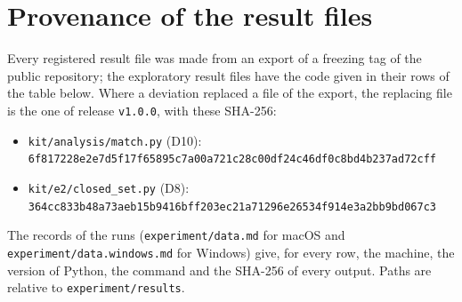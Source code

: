 
\section*{Provenance of the result files}
\label{sec:supp-provenance}

Every registered result file was made from an export of a freezing tag of the public repository; the exploratory result
files have the code given in their rows of the table below. Where a deviation replaced a file of the export, the
replacing file is the one of release \texttt{v1.0.0}, with these SHA-256:
\begin{itemize}
\item \texttt{kit/analysis/match.py} (D10):\\
{\footnotesize\texttt{6f817228e2e7d5f17f65895c7a00a721c28c00df24c46df0c8bd4b237ad72cff}}
\item \texttt{kit/e2/closed\_set.py} (D8):\\
{\footnotesize\texttt{364cc833b48a73aeb15b9416bff203ec21a71296e26534f914e3a2bb9bd067c3}}
\end{itemize}
The records of the runs (\texttt{experiment/data.md} for macOS and \texttt{experiment/data.windows.md} for Windows)
give, for every row, the machine, the version of Python, the command and the SHA-256 of every output. Paths are
relative to \texttt{experiment/results}.

